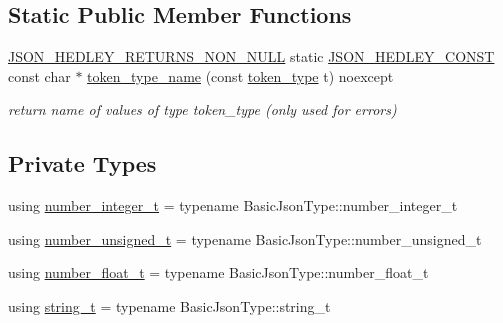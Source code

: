 \subsection*{Static Public Member Functions}
\begin{DoxyCompactItemize}
\item 
\mbox{\hyperlink{json_8hpp_a5f2aaec3b681d0a72f7d6e90b70cdcd1}{J\+S\+O\+N\+\_\+\+H\+E\+D\+L\+E\+Y\+\_\+\+R\+E\+T\+U\+R\+N\+S\+\_\+\+N\+O\+N\+\_\+\+N\+U\+LL}} static \mbox{\hyperlink{json_8hpp_a0d17bf1a54fc45a04ced6d3aa86a96e3}{J\+S\+O\+N\+\_\+\+H\+E\+D\+L\+E\+Y\+\_\+\+C\+O\+N\+ST}} const char $\ast$ \mbox{\hyperlink{classnlohmann_1_1detail_1_1lexer_adb831e1f692a45c2281ed3d59ddf1e17}{token\+\_\+type\+\_\+name}} (const \mbox{\hyperlink{classnlohmann_1_1detail_1_1lexer_a3f313cdbe187cababfc5e06f0b69b098}{token\+\_\+type}} t) noexcept
\begin{DoxyCompactList}\small\item\em return name of values of type token\+\_\+type (only used for errors) \end{DoxyCompactList}\end{DoxyCompactItemize}
\subsection*{Private Types}
\begin{DoxyCompactItemize}
\item 
using \mbox{\hyperlink{classnlohmann_1_1detail_1_1lexer_a9cd1b11cc67edbfb2613c788b5bd337c}{number\+\_\+integer\+\_\+t}} = typename Basic\+Json\+Type\+::number\+\_\+integer\+\_\+t
\item 
using \mbox{\hyperlink{classnlohmann_1_1detail_1_1lexer_a105d1dfeab414a572655895cdd96a52a}{number\+\_\+unsigned\+\_\+t}} = typename Basic\+Json\+Type\+::number\+\_\+unsigned\+\_\+t
\item 
using \mbox{\hyperlink{classnlohmann_1_1detail_1_1lexer_aa7f9e7b2bcd311fb86e2da43761a6619}{number\+\_\+float\+\_\+t}} = typename Basic\+Json\+Type\+::number\+\_\+float\+\_\+t
\item 
using \mbox{\hyperlink{classnlohmann_1_1detail_1_1lexer_ab63d35c658887592a4b09ad26eb4c795}{string\+\_\+t}} = typename Basic\+Json\+Type\+::string\+\_\+t
\end{DoxyCompactItemize}
